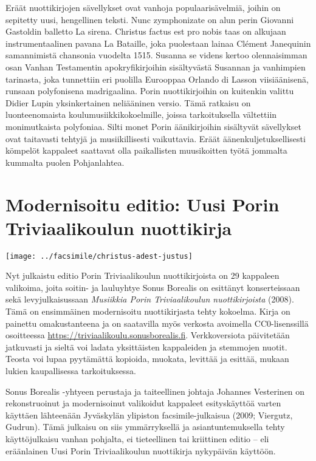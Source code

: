 Eräät nuottikirjojen sävellykset ovat vanhoja populaarisävelmiä, joihin on sepitetty uusi, hengellinen teksti. Nunc zymphonizate on alun perin Giovanni Gastoldin balletto La sirena. Christus factus est pro nobis taas on alkujaan instrumentaalinen pavana La Bataille, joka puolestaan lainaa Clément Janequinin samannimistä chansonia vuodelta 1515. Susanna se videns kertoo olennaisimman osan Vanhan Testamentin apokryfikirjoihin sisältyvästä Susannan ja vanhimpien tarinasta, joka tunnettiin eri puolilla Eurooppaa Orlando di Lasson viisiäänisenä, runsaan polyfonisena madrigaalina. Porin nuottikirjoihin on kuitenkin valittu Didier Lupin yksinkertainen neliääninen versio. Tämä ratkaisu on luonteenomaista koulumusiikkikokoelmille, joissa tarkoituksella vältettiin monimutkaista polyfoniaa. Silti monet Porin äänikirjoihin sisältyvät sävellykset ovat taitavasti tehtyjä ja musiikillisesti vaikuttavia. Eräät äänenkuljetuksellisesti kömpelöt kappaleet saattavat olla paikallisten muusikoitten työtä jommalta kummalta puolen Pohjanlahtea.

\section*{Modernisoitu editio: Uusi Porin Triviaalikoulun nuottikirja}

\texttt{[image: ../facsimile/christus-adest-justus]}

Nyt julkaistu editio Porin Triviaalikoulun nuottikirjoista on 29 kappaleen valikoima, joita soitin- ja lauluyhtye Sonus Borealis on esittänyt konserteissaan sekä levyjulkaisussaan \textit{Musiikkia Porin Triviaalikoulun nuottikirjoista} (2008). Tämä on ensimmäinen modernisoitu nuottikirjasta tehty kokoelma. Kirja on painettu omakustanteena ja on saatavilla myös verkosta avoimella CC0-lisenssillä osoitteessa \url{https://triviaalikoulu.sonusborealis.fi}. Verkkoversiota päivitetään jatkuvasti ja sieltä voi ladata yksittäisten kappaleiden ja stemmojen nuotit. Teosta voi lupaa pyytämättä kopioida, muokata, levittää ja esittää, mukaan lukien kaupallisessa tarkoituksessa.

Sonus Borealis -yhtyeen perustaja ja taiteellinen johtaja Johannes Vesterinen on rekonstruoinut ja modernisoinut valikoidut kappaleet esityskäyttöä varten käyttäen lähteenään Jyväskylän ylipiston facsimile-julkaisua (2009; Viergutz, Gudrun). Tämä julkaisu on siis ymmärryksellä ja asiantuntemuksella tehty käyttöjulkaisu vanhan pohjalta, ei tieteellinen tai kriittinen editio -- eli eräänlainen Uusi Porin Triviaalikoulun nuottikirja nykypäivän käyttöön.

